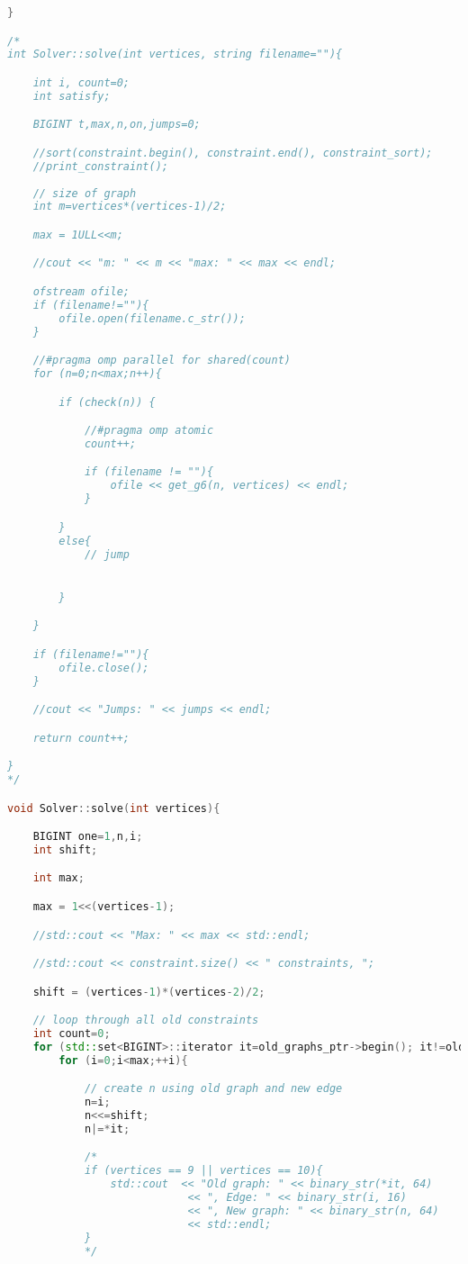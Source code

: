\documentclass[12pt]{etsu_thesis}
\begin{document}
\begin{lstlisting}[language=C++]
}

/*
int Solver::solve(int vertices, string filename=""){

	int i, count=0;
	int satisfy;

	BIGINT t,max,n,on,jumps=0;

	//sort(constraint.begin(), constraint.end(), constraint_sort);
	//print_constraint();
	
	// size of graph
	int m=vertices*(vertices-1)/2;

	max = 1ULL<<m;

	//cout << "m: " << m << "max: " << max << endl;

	ofstream ofile;
	if (filename!=""){
		ofile.open(filename.c_str());
	}

	//#pragma omp parallel for shared(count)
	for (n=0;n<max;n++){

		if (check(n)) {

			//#pragma omp atomic
			count++;

			if (filename != ""){
				ofile << get_g6(n, vertices) << endl;
			}

		}
        else{
            // jump


        }

	}

	if (filename!=""){
		ofile.close();
	}	

	//cout << "Jumps: " << jumps << endl;

	return count++;

}
*/

void Solver::solve(int vertices){

    BIGINT one=1,n,i;
    int shift;

    int max;

    max = 1<<(vertices-1);

    //std::cout << "Max: " << max << std::endl;

    //std::cout << constraint.size() << " constraints, ";

    shift = (vertices-1)*(vertices-2)/2;

    // loop through all old constraints
    int count=0;
    for (std::set<BIGINT>::iterator it=old_graphs_ptr->begin(); it!=old_graphs_ptr->end(); ++it){
        for (i=0;i<max;++i){

            // create n using old graph and new edge
            n=i;
            n<<=shift;
            n|=*it;

            /*
            if (vertices == 9 || vertices == 10){
                std::cout  << "Old graph: " << binary_str(*it, 64) 
                            << ", Edge: " << binary_str(i, 16)
                            << ", New graph: " << binary_str(n, 64) 
                            << std::endl;
            }
            */             


\end{lstlisting}
\end{document}
